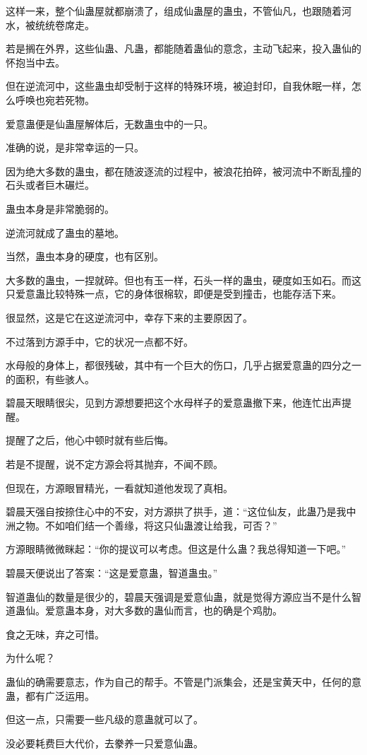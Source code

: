 \begin{this_body}
这样一来，整个仙蛊屋就都崩溃了，组成仙蛊屋的蛊虫，不管仙凡，也跟随着河水，被统统卷席走。

若是搁在外界，这些仙蛊、凡蛊，都能随着蛊仙的意念，主动飞起来，投入蛊仙的怀抱当中去。

但在逆流河中，这些蛊虫却受制于这样的特殊环境，被迫封印，自我休眠一样，怎么呼唤也宛若死物。

爱意蛊便是仙蛊屋解体后，无数蛊虫中的一只。

准确的说，是非常幸运的一只。

因为绝大多数的蛊虫，都在随波逐流的过程中，被浪花拍碎，被河流中不断乱撞的石头或者巨木碾烂。

蛊虫本身是非常脆弱的。

逆流河就成了蛊虫的墓地。

当然，蛊虫本身的硬度，也有区别。

大多数的蛊虫，一捏就碎。但也有玉一样，石头一样的蛊虫，硬度如玉如石。而这只爱意蛊比较特殊一点，它的身体很棉软，即便是受到撞击，也能存活下来。

很显然，这是它在这逆流河中，幸存下来的主要原因了。

不过落到方源手中，它的状况一点都不好。

水母般的身体上，都很残破，其中有一个巨大的伤口，几乎占据爱意蛊的四分之一的面积，有些骇人。

碧晨天眼睛很尖，见到方源想要把这个水母样子的爱意蛊撤下来，他连忙出声提醒。

提醒了之后，他心中顿时就有些后悔。

若是不提醒，说不定方源会将其抛弃，不闻不顾。

但现在，方源眼冒精光，一看就知道他发现了真相。

碧晨天强自按捺住心中的不安，对方源拱了拱手，道：“这位仙友，此蛊乃是我中洲之物。不如咱们结一个善缘，将这只仙蛊渡让给我，可否？”

方源眼睛微微眯起：“你的提议可以考虑。但这是什么蛊？我总得知道一下吧。”

碧晨天便说出了答案：“这是爱意蛊，智道蛊虫。”

智道蛊仙的数量是很少的，碧晨天强调是爱意仙蛊，就是觉得方源应当不是什么智道蛊仙。爱意蛊本身，对大多数的蛊仙而言，也的确是个鸡肋。

食之无味，弃之可惜。

为什么呢？

蛊仙的确需要意志，作为自己的帮手。不管是门派集会，还是宝黄天中，任何的意蛊，都有广泛运用。

但这一点，只需要一些凡级的意蛊就可以了。

没必要耗费巨大代价，去豢养一只爱意仙蛊。


\end{this_body}

